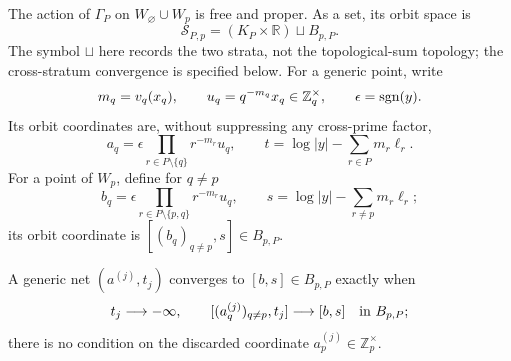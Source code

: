\begin{theorem}
\label{thm:multiplace-finite-edge-coordinates}
The action of $\Gamma_P$ on $W_{\varnothing}\cup W_p$ is free and proper.
As a set, its orbit space is
\begin{equation}
 \mathcal S_{P,p}=(K_P\times\mathbb R)\sqcup B_{p,P}.
 \label{eq:multiplace-finite-edge-space}
\end{equation}
The symbol $\sqcup$ here records the two strata, not the topological-sum
topology; the cross-stratum convergence is specified below.
For a generic point, write
\[
 m_q=v_q(x_q),\qquad u_q=q^{-m_q}x_q\in\mathbb Z_q^{\times},
 \qquad\epsilon=\operatorname{sgn}(y).
\]
Its orbit coordinates are, without suppressing any cross-prime factor,
\begin{equation}
 a_q=\epsilon\!\prod_{r\in P\setminus\{q\}}r^{-m_r}u_q,
 \qquad
 t=\log|y|-\sum_{r\in P}m_r\ell_r.
 \label{eq:multiplace-generic-coordinates}
\end{equation}
For a point of $W_p$, define for $q\ne p$
\begin{equation}
 b_q=\epsilon\!\prod_{r\in P\setminus\{p,q\}}r^{-m_r}u_q,
 \qquad
 s=\log|y|-\sum_{r\ne p}m_r\ell_r;
 \label{eq:multiplace-p-boundary-coordinates}
\end{equation}
its orbit coordinate is $[(b_q)_{q\ne p},s]\in B_{p,P}$.

A generic net $(a^{(j)},t_j)$ converges to $[b,s]\in B_{p,P}$ exactly when
\begin{equation}
 t_j\longrightarrow-\infty,\qquad
 [(a_q^{(j)})_{q\ne p},t_j]\longrightarrow[b,s]
 \quad\hbox{in }B_{p,P};
 \label{eq:multiplace-finite-cross-convergence}
\end{equation}
there is no condition on the discarded coordinate
$a_p^{(j)}\in\mathbb Z_p^{\times}$.
\end{theorem}

